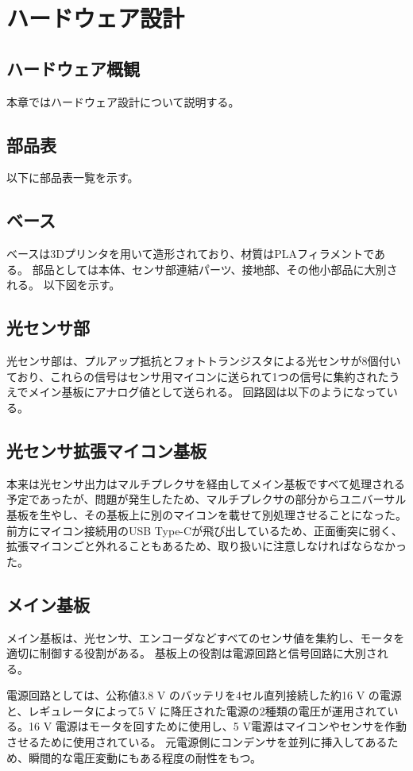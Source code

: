 \documentclass{ltjsreport}
\begin{document}
\chapter{ハードウェア設計}
\section{ハードウェア概観}
本章ではハードウェア設計について説明する。

\section{部品表}
以下に部品表一覧を示す。
\section{ベース}
ベースは3Dプリンタを用いて造形されており、材質はPLAフィラメントである。
部品としては本体、センサ部連結パーツ、接地部、その他小部品に大別される。
以下図を示す。

\section{光センサ部}
光センサ部は、プルアップ抵抗とフォトトランジスタによる光センサが8個付いており、これらの信号はセンサ用マイコンに送られて1つの信号に集約されたうえでメイン基板にアナログ値として送られる。
回路図は以下のようになっている。

\section{光センサ拡張マイコン基板}
本来は光センサ出力はマルチプレクサを経由してメイン基板ですべて処理される予定であったが、問題が発生したため、マルチプレクサの部分からユニバーサル基板を生やし、その基板上に別のマイコンを載せて別処理させることになった。
前方にマイコン接続用のUSB Type-Cが飛び出しているため、正面衝突に弱く、拡張マイコンごと外れることもあるため、取り扱いに注意しなければならなかった。

\section{メイン基板}
メイン基板は、光センサ、エンコーダなどすべてのセンサ値を集約し、モータを適切に制御する役割がある。
基板上の役割は電源回路と信号回路に大別される。

電源回路としては、公称値3.8 V のバッテリを4セル直列接続した約16 V の電源と、レギュレータによって5 V に降圧された電源の2種類の電圧が運用されている。16 V 電源はモータを回すために使用し、5 V電源はマイコンやセンサを作動させるために使用されている。
元電源側にコンデンサを並列に挿入してあるため、瞬間的な電圧変動にもある程度の耐性をもつ。
\end{document}
